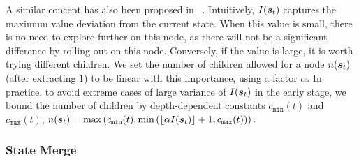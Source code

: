 A similar concept has also been proposed in ~\cite{taylor2014reinforcement, clouse1996integrating}. Intuitively, $I({\bm{s}}_t)$ captures the maximum value deviation from the current state. When this value is small, there is no need to explore further on this node, as there will not be a significant difference by rolling out on this node. Conversely, if the value is large, it is worth trying different children. We set the number of children allowed for a node $n({\bm{s}}_t)$ (after extracting $1$) to be linear with this importance, using a factor $\alpha$. In practice, to avoid extreme cases of large variance of $I({\bm{s}}_t)$ in the early stage, we bound the number of children by depth-dependent constants $c_{\mathtt{min}}(t)$ and $c_{\mathtt{max}}(t)$, $n({\bm{s}}_t) = \max\left(c_{\mathtt{min}}(t), \min\left(\lfloor \alpha I({\bm{s}}_t) \rfloor+1, c_{\mathtt{max}}(t)\right)\right).$

\subsubsection{State Merge}




